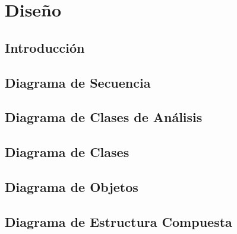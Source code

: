 \chapter{Diseño}

\section{Introducción}

\newpage

\section{Diagrama de Secuencia}

\newpage

\section{Diagrama de Clases de Análisis}

\newpage

\section{Diagrama de Clases}

\newpage

\section{Diagrama de Objetos}

\newpage

\section{Diagrama de Estructura Compuesta}

\newpage